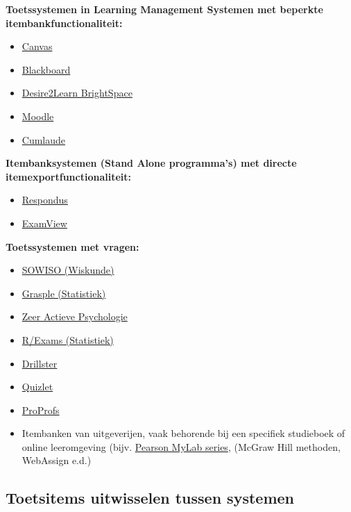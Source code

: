 \documentclass[
]{book}
\providecommand{\tightlist}{%
  \setlength{\itemsep}{0pt}\setlength{\parskip}{0pt}}
\begin{document}
\textbf{Toetssystemen in Learning Management Systemen met beperkte itembankfunctionaliteit:}

\begin{itemize}
\tightlist
\item
  \href{https://www.canvaslms.com/}{Canvas}
\item
  \href{http://www.blackboard.com}{Blackboard}
\item
  \href{https://www.d2l.com/products/learning-environment/}{Desire2Learn BrightSpace}
\item
  \href{https://moodle.com/}{Moodle}
\item
  \href{https://www.cumlaudelearning.com/}{Cumlaude}
\end{itemize}

\textbf{Itembanksystemen (Stand Alone programma's) met directe itemexportfunctionaliteit:}

\begin{itemize}
\tightlist
\item
  \href{https://www.respondus.com/}{Respondus}
\item
  \href{https://www.turningtechnologies.com/examview}{ExamView}
\end{itemize}

\textbf{Toetssystemen met vragen:}

\begin{itemize}
\tightlist
\item
  \href{https://sowiso.nl/nl/}{SOWISO (Wiskunde)}
\item
  \href{https://www.grasple.com/}{Grasple (Statistiek)}
\item
  \href{http://zap.psy.utwente.nl/}{Zeer Actieve Psychologie}
\item
  \href{http://www.r-exams.org/}{R/Exams (Statistiek)}
\item
  \href{https://www.drillster.com/info/}{Drillster}
\item
  \href{https://quizlet.com/}{Quizlet}
\item
  \href{https://www.proprofs.com/}{ProProfs}
\item
  Itembanken van uitgeverijen, vaak behorende bij een specifiek studieboek of online leeromgeving (bijv. \href{https://mlm.pearson.com/}{Pearson MyLab series}, (McGraw Hill methoden, WebAssign e.d.)
\end{itemize}

\hypertarget{toetsitems-uitwisselen-tussen-systemen}{%
\subsection{Toetsitems uitwisselen tussen systemen}\label{toetsitems-uitwisselen-tussen-systemen}}
\end{document}
